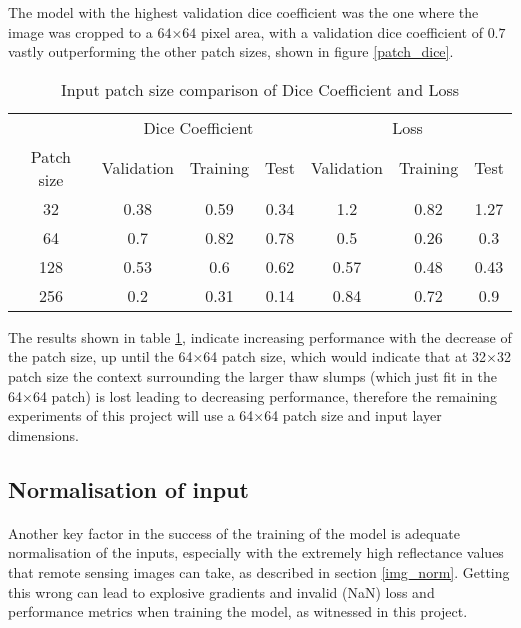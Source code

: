 The model with the highest validation dice coefficient was the one where the image was cropped to a $64$×$64$ pixel area, with a validation dice coefficient of $0.7$ vastly outperforming the other patch sizes, shown in figure \ref{patch_dice}.
\begin{table}[ht!] 
    \begin{center}
    \begin{tabular}{ccccccc} 
    \toprule
       & \multicolumn{3}{c}{Dice Coefficient}     & \multicolumn{3}{c}{Loss} \\
    Patch size & Validation & Training & Test & Validation & Training & Test \\ \midrule
32 & 0.38 & 0.59 & 0.34 & 1.2 & 0.82 & 1.27 \\ \rowcolor{lightgray} 64 & 0.7 & 0.82 & 0.78 & 0.5 & 0.26 & 0.3  \\ 128 & 0.53 & 0.6 & 0.62 & 0.57 & 0.48 & 0.43  \\ 256 & 0.2 & 0.31 & 0.14 & 0.84 & 0.72 & 0.9  \\
\bottomrule
    \end{tabular}
  \end{center} 
  \caption{Input patch size comparison of Dice Coefficient and Loss}\label{tab_patch}
\end{table}

The results shown in table \ref{tab_patch}, indicate increasing performance with the decrease of the patch size, up until the 64×64 patch size, which would indicate that at 32×32 patch size the context surrounding the larger thaw slumps (which just fit in the 64×64 patch) is lost leading to decreasing performance, therefore the remaining experiments of this project will use a 64×64 patch size and input layer dimensions.
\subsection{Normalisation of input}
\paragraph{}
Another key factor in the success of the training of the model is adequate normalisation of the inputs, especially with the extremely high reflectance values that remote sensing images can take, as described in section \ref{img_norm}. Getting this wrong can lead to explosive gradients and invalid (NaN) loss and performance metrics when training the model, as witnessed in this project.

